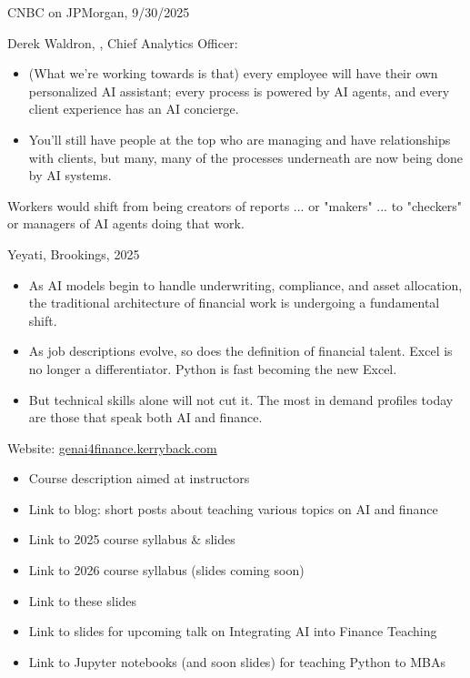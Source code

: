 \documentclass{beamer}
\begin{document}
\begin{frame}{CNBC on JPMorgan, 9/30/2025}

Derek Waldron, , Chief Analytics Officer:
\begin{itemize}
\item (What we're working towards is that) every employee will have their own personalized AI assistant; every process is powered by AI agents, and every client experience has an AI concierge.
\item You'll still have people at the top who are managing and have relationships with clients, but many, many of the processes underneath are now being done by AI systems.
\end{itemize}


Workers would shift from being creators of reports ... or "makers" ... to "checkers" or managers of AI agents doing that work.

\end{frame}

\begin{frame}{Yeyati, Brookings, 2025}

\begin{itemize}
\item As AI models begin to handle underwriting, compliance, and asset allocation, the traditional architecture of financial work is undergoing a fundamental shift.
\item As job descriptions evolve, so does the definition of financial talent. Excel is no longer a differentiator. Python is fast becoming the new Excel. 
\item But technical skills alone will not cut it. The most in demand profiles today are those that speak both AI and finance.
\end{itemize}
\end{frame}

\begin{frame}{Website: \href{https://genai4finance.kerryback.com}{genai4finance.kerryback.com}}
\begin{itemize}
\item Course description aimed at instructors
\item Link to blog: short posts about teaching various topics on AI and finance 
\item Link to 2025 course syllabus \& slides
\item Link to 2026 course syllabus (slides coming soon)
\item Link to these slides
\item Link to slides for upcoming talk on Integrating AI into Finance Teaching
\item Link to Jupyter notebooks (and soon slides) for teaching Python to MBAs
\end{itemize}
\end{frame} 
\end{document}

